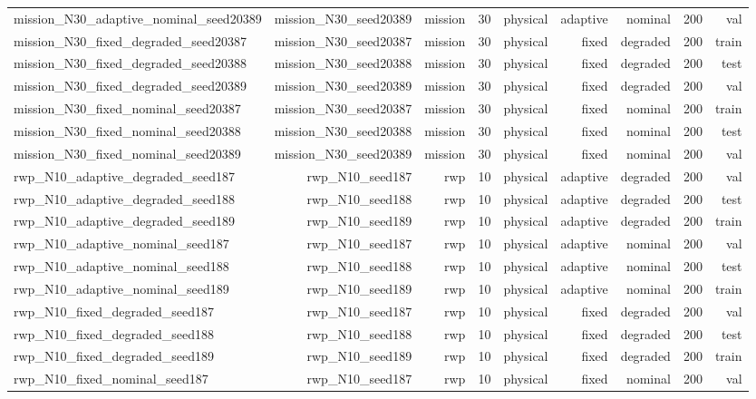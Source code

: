 \begin{tabular}{lrrrrrrrr}
mission\_N30\_adaptive\_nominal\_seed20389 & mission\_N30\_seed20389 & mission & 30 & physical & adaptive & nominal & 200 & val \\
mission\_N30\_fixed\_degraded\_seed20387 & mission\_N30\_seed20387 & mission & 30 & physical & fixed & degraded & 200 & train \\
mission\_N30\_fixed\_degraded\_seed20388 & mission\_N30\_seed20388 & mission & 30 & physical & fixed & degraded & 200 & test \\
mission\_N30\_fixed\_degraded\_seed20389 & mission\_N30\_seed20389 & mission & 30 & physical & fixed & degraded & 200 & val \\
mission\_N30\_fixed\_nominal\_seed20387 & mission\_N30\_seed20387 & mission & 30 & physical & fixed & nominal & 200 & train \\
mission\_N30\_fixed\_nominal\_seed20388 & mission\_N30\_seed20388 & mission & 30 & physical & fixed & nominal & 200 & test \\
mission\_N30\_fixed\_nominal\_seed20389 & mission\_N30\_seed20389 & mission & 30 & physical & fixed & nominal & 200 & val \\
rwp\_N10\_adaptive\_degraded\_seed187 & rwp\_N10\_seed187 & rwp & 10 & physical & adaptive & degraded & 200 & val \\
rwp\_N10\_adaptive\_degraded\_seed188 & rwp\_N10\_seed188 & rwp & 10 & physical & adaptive & degraded & 200 & test \\
rwp\_N10\_adaptive\_degraded\_seed189 & rwp\_N10\_seed189 & rwp & 10 & physical & adaptive & degraded & 200 & train \\
rwp\_N10\_adaptive\_nominal\_seed187 & rwp\_N10\_seed187 & rwp & 10 & physical & adaptive & nominal & 200 & val \\
rwp\_N10\_adaptive\_nominal\_seed188 & rwp\_N10\_seed188 & rwp & 10 & physical & adaptive & nominal & 200 & test \\
rwp\_N10\_adaptive\_nominal\_seed189 & rwp\_N10\_seed189 & rwp & 10 & physical & adaptive & nominal & 200 & train \\
rwp\_N10\_fixed\_degraded\_seed187 & rwp\_N10\_seed187 & rwp & 10 & physical & fixed & degraded & 200 & val \\
rwp\_N10\_fixed\_degraded\_seed188 & rwp\_N10\_seed188 & rwp & 10 & physical & fixed & degraded & 200 & test \\
rwp\_N10\_fixed\_degraded\_seed189 & rwp\_N10\_seed189 & rwp & 10 & physical & fixed & degraded & 200 & train \\
rwp\_N10\_fixed\_nominal\_seed187 & rwp\_N10\_seed187 & rwp & 10 & physical & fixed & nominal & 200 & val \\

\end{tabular}
